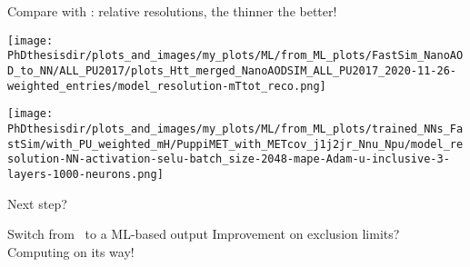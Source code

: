 \addtocounter{framenumber}{-1}
\begin{frame}

\vspace{-5pt}
\manip Compare with \mTtot: relative resolutions, the thinner the better!

\vspace{5pt}

\begin{minipage}[c]{.475\textwidth}
\begin{center}\vspace{-4pt}
\texttt{[image: \\PhDthesisdir/plots\_and\_images/my\_plots/ML/from\_ML\_plots/FastSim\_NanoAOD\_to\_NN/ALL\_PU2017/plots\_Htt\_merged\_NanoAODSIM\_ALL\_PU2017\_2020-11-26-weighted\_entries/model\_resolution-mTtot\_reco.png]}
\end{center}\vspace{-5pt}
\end{minipage}
\hfill
\begin{minipage}[c]{.475\textwidth}
\begin{center}\vspace{-4pt}
\texttt{[image: \\PhDthesisdir/plots\_and\_images/my\_plots/ML/from\_ML\_plots/trained\_NNs\_FastSim/with\_PU\_weighted\_mH/PuppiMET\_with\_METcov\_j1j2jr\_Nnu\_Npu/model\_resolution-NN-activation-selu-batch\_size-2048-mape-Adam-u-inclusive-3-layers-1000-neurons.png]}
\end{center}\vspace{-5pt}
\end{minipage}

\end{frame}

\begin{frame}{Next step?}

\manip Switch from \mTtot\ to a ML-based output
\manip Improvement on exclusion limits?
\manip Computing on its way!

\end{frame}